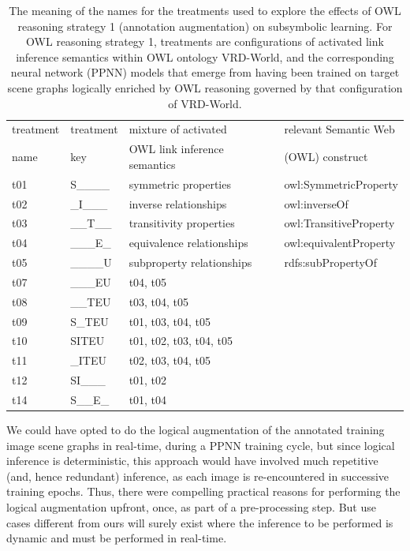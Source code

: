 \documentclass[]{jair}
\begin{document}
\begin{table}[t]
  \centering
  \footnotesize
  \begin{threeparttable}
  \caption{\footnotesize The meaning of the names for the treatments used to explore the effects of OWL reasoning strategy 1 (annotation augmentation) on subsymbolic learning. For OWL reasoning strategy 1, treatments are configurations of activated link inference semantics within OWL ontology VRD-World, and the corresponding neural network (PPNN) models that emerge from having been trained on target scene graphs logically enriched by OWL reasoning governed by that configuration of VRD-World.}
  \label{table:invest1-treatments}
  \begin{tabular}{llll}
    \toprule 
     treatment   & treatment  & mixture of activated & relevant Semantic Web \\
     name        &  key & OWL link inference semantics & (OWL) construct \\
    \midrule
    t01 & S\_\_\_\_  & symmetric properties & owl:SymmetricProperty \\
    t02 & \_I\_\_\_  & inverse relationships & owl:inverseOf  \\
    t03 & \_\_T\_\_  & transitivity properties & owl:TransitiveProperty \\
    t04 & \_\_\_E\_  & equivalence relationships & owl:equivalentProperty \\
    t05 & \_\_\_\_U  & subproperty relationships & rdfs:subPropertyOf \\
    t07 & \_\_\_EU  & t04, t05  \\
    t08 & \_\_TEU  & t03, t04, t05  \\
    t09 & S\_TEU  & t01, t03, t04, t05  \\
    t10 & SITEU  & t01, t02, t03, t04, t05  \\
    t11 & \_ITEU  & t02, t03, t04, t05  \\
    t12 & SI\_\_\_  & t01, t02  \\
    t14 & S\_\_E\_  & t01, t04  \\
    \bottomrule 
  \end{tabular}
  \end{threeparttable}
\end{table}

We could have opted to do the logical augmentation of the annotated training image scene graphs in real-time, during a PPNN training cycle, but since logical inference is deterministic, this approach would have involved much repetitive (and, hence redundant) inference, as each image is re-encountered in successive training epochs.
Thus, there were compelling practical reasons for performing the logical augmentation upfront, once, as part of a pre-processing step.
But use cases different from ours will surely exist where the inference to be performed is dynamic and must be performed in real-time.
\end{document}
